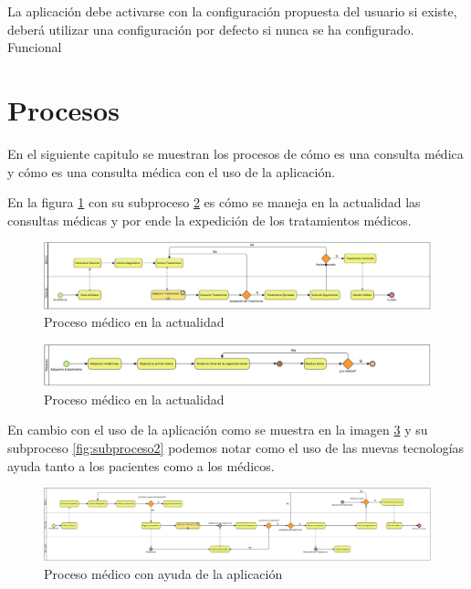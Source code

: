 	
	\begin{ReqSist}
		{La aplicación debe activarse con la configuración propuesta del usuario si existe, deberá utilizar una configuración por defecto si nunca se ha configurado.}
		{\alta}
		{}
		{Funcional}
		
	\end{ReqSist}
	
	
	
	


\section{Procesos}

En el siguiente capitulo se muestran los procesos de cómo es una consulta médica y cómo es una consulta médica con el uso de la aplicación.


En la figura \ref{fig:proceso1} con su subproceso \ref{fig:subproceso1} es cómo se maneja en la actualidad las consultas médicas y por ende la expedición de los tratamientos médicos.
\begin{figure}[htb]
	\centering
	\includegraphics[width=1.1\textwidth]{images/cap2/Proceso1}
	\caption{Proceso médico en la actualidad} \label{fig:proceso1}
\end{figure}

\begin{figure}[htb]
	\centering
	\includegraphics[width=1.1\textwidth]{images/cap2/AdquiereTratamientoP1}
	\caption{Proceso médico en la actualidad} \label{fig:subproceso1}
\end{figure}

En cambio con el uso de la aplicación como se muestra en la imagen \ref{fig:proceso2} y su subproceso \ref{fig:subproceso2} podemos notar como el uso de las nuevas tecnologías ayuda tanto a los pacientes como a los médicos.

\begin{figure}[htb]
	\centering
	\includegraphics[width=1.1\textwidth]{images/cap2/Proceso2}
	\caption{Proceso médico con ayuda de la aplicación} \label{fig:proceso2}
\end{figure}

